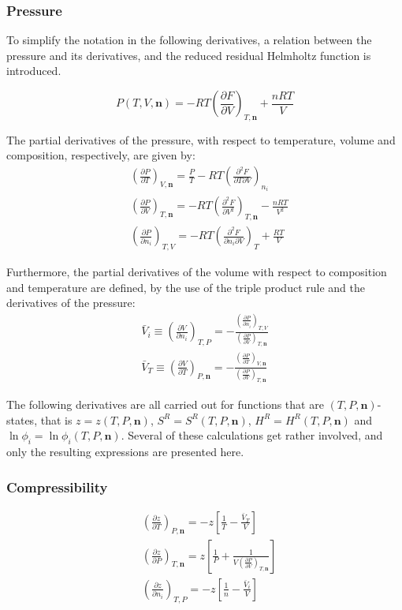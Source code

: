 \documentclass[english]{../thermomemo/thermomemo}
\newcommand*{\pder}[2]{\left(\frac{\partial #1}{\partial #2}\right)}
\newcommand*{\pdder}[2]{\left(\frac{\partial^2 #1}{\partial #2^2}\right)}
\newcommand*{\pdcross}[3]{\left(\frac{\partial^2 #1}{\partial #2 \partial #3}\right)}
\numberwithin{equation}{section}
\begin{document}
\subsubsection*{Pressure}
To simplify the notation in the following derivatives, a relation
between the pressure and its derivatives, and the reduced residual
Helmholtz function is introduced.

\begin{equation}
  \label{def:P}
  P(T,V,\textbf{n}) = -RT \left( \frac{\partial F}{\partial V} \right)_{T, \textbf{n}} + \frac{nRT}{V}
\end{equation}

The partial derivatives of the pressure, with respect to temperature,
volume and composition, respectively, are given by:
\begin{align}
  \label{eq:P_T}
  & \pder{P}{T}_{V, \textbf{n}} = \frac{P}{T} - RT \pdcross{F}{T}{V}_{n_i} \\
  \label{eq:P_V}
  & \pder{P}{V}_{T, \textbf{n}} = -RT \pdder{F}{V}_{T, \textbf{n}} - \frac{nRT}{V^2} \\
  \label{eq:P_i}
  & \pder{P}{n_i}_{T,V} = -RT \pdcross{F}{n_i}{V}_T + \frac{RT}{V}
\end{align}

Furthermore, the partial derivatives of the volume with respect to
composition and temperature are defined, by the use of the triple
product rule and the derivatives of the pressure:
\begin{align}
  \label{def:V_i}
  \bar{V}_i \equiv \pder{V}{n_i}_{T,P} =  - \frac{\pder{P}{n_i}_{T,V}}{\pder{P}{V}_{T,\textbf{n}}} \\
  \label{def:V_T}
  \bar{V}_T \equiv \pder{V}{T}_{P,\textbf{n}} = -
  \frac{\pder{P}{T}_{V,\textbf{n}}}{\pder{P}{V}_{T,\textbf{n}}}
\end{align}

The following derivatives are all carried out for functions that are
$(T,P,\textbf{n})$-states, that is $z = z(T,P,\textbf{n})$, $S^R =
S^R(T,P,\textbf{n})$, $H^R = H^R(T,P,\textbf{n})$ and $\ln \phi_i =
\ln \phi_i(T,P,\textbf{n})$. Several of these calculations get rather
involved, and only the resulting expressions are presented here.

\subsubsection*{Compressibility}
\begin{align}
  \label{eq:z_T}
  & \left( \frac{\partial z}{\partial T} \right)_{P, \textbf{n}} = -z\left[\frac{1}{T} - \frac{\bar{V}_T}{V}\right] \\
  \label{eq:z_P}
  & \left( \frac{\partial z}{\partial P} \right)_{T, \textbf{n}} = z \left[ \frac{1}{P} + \frac{1}{V \pder{P}{V}_{T,\textbf{n}}} \right] \\
  \label{eq:z_i}
  & \left( \frac{\partial z}{\partial n_i} \right)_{T,P} = - z \left[
    \frac{1}{n} - \frac{\bar{V}_i}{V} \right]
\end{align}
\end{document}
